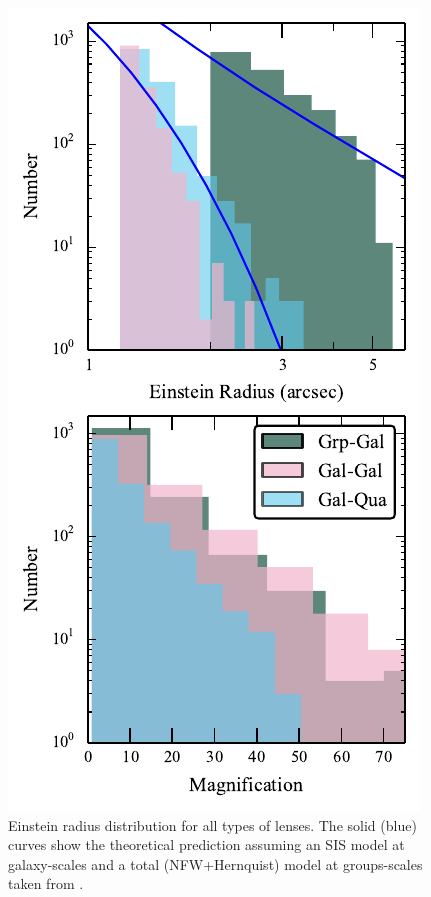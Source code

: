 \documentclass[useAMS,usenatbib,a4paper]{mn2e}
\begin{document}
\begin{figure}
\begin{center}
\includegraphics[scale=1.2]{distrib_remu.pdf}
\caption{ \label{fig:remudist}
Einstein radius distribution for all types of lenses. The solid (blue)
curves show the theoretical prediction assuming an SIS model at galaxy-scales
and a total (NFW+Hernquist) model at groups-scales taken from \citep{More2012}.
}
\end{center}
\end{figure}
\end{document}
